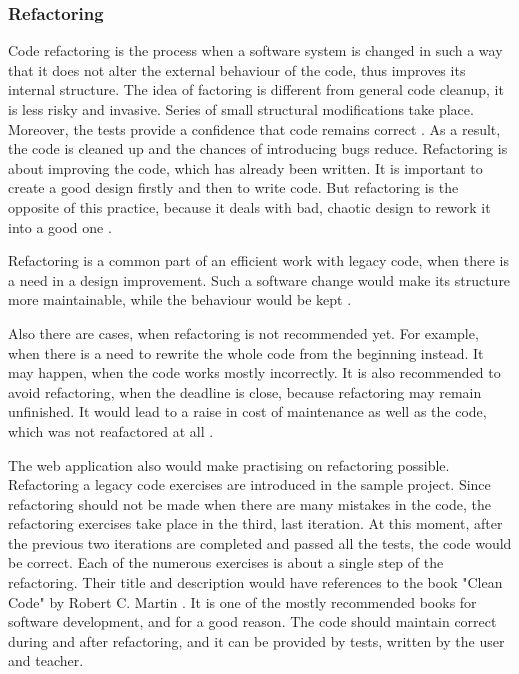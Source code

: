 \subsubsection{Refactoring}
Code refactoring is the process when a software system is changed in such a way that it does not alter the external behaviour of the code, thus improves its internal structure. The idea of factoring is different from general code cleanup, it is less risky and invasive. Series of small structural modifications take place. Moreover, the tests provide a confidence that code remains correct \cite{lc_effectively}. As a result, the code is cleaned up and the chances of introducing bugs reduce. Refactoring is about improving the code, which has already been written. It is important to create a good design firstly and then to write code. But refactoring is the opposite of this practice, because it deals with bad, chaotic design to rework it into a good one \cite[Preface]{ref_ec}.

Refactoring is a common part of an efficient work with legacy code, when there is a need in a design improvement. Such a software change would make its structure more maintainable, while the behaviour would be kept \cite{lc_effectively}.

Also there are cases, when refactoring is not recommended yet. For example, when there is a need to rewrite the whole code from the beginning instead. It may happen, when the code works mostly incorrectly. It is also recommended to avoid refactoring, when the deadline is close, because refactoring may remain unfinished. It would lead to a raise in cost of maintenance as well as the code, which was not reafactored at all \cite[Preface]{ref_debt}.

The web application also would make practising on refactoring possible. Refactoring a legacy code exercises are introduced in the sample project. Since refactoring should not be made when there are many mistakes in the code, the refactoring exercises take place in the third, last iteration. At this moment, after the previous two iterations are completed and passed all the tests, the code would be correct. Each of the numerous exercises is about a single step of the refactoring. Their title and description would have references to the book "Clean Code" by Robert C. Martin \cite{clean_code}. It is one of the mostly recommended books for software development, and for a good reason. The code should maintain correct during and after refactoring, and it can be provided by tests, written by the user and teacher.

